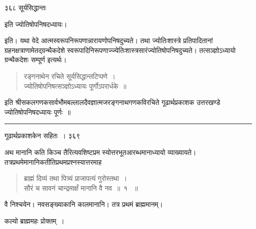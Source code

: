 \documentclass[11pt, openany]{book}
\begin{document}
\newpage


\noindent ३६८ \hspace{4cm} सूर्यसिद्धान्तः 
\vspace{1cm}

\begin{center}
  इति ज्योतिषोपनिषदध्यायः। 
\end{center}



 इति। यथा वेदे आत्मस्वरूपनिरूपणान्नारायणोपनिषदुच्यते। तथा ज्योतिःशास्त्रे प्रतिपादितानां ग्रहनक्षत्राणामेतद्ग्रन्थैकदेशे स्वरूपादिनिरूपणाज्ज्येतिःशास्त्रसारंज्योतिषोपनिषदुच्यते। तत्सञ्ज्ञोऽध्यायो ग्रन्थैकदेशः सम्पूर्ण इत्यर्थः। 


\begin{quote}
 {\qt रङ्गनाथेन रचिते सूर्यसिद्धान्तटिप्पणे~।\\
 ज्योतिषोपनिषत्सञ्ज्ञोऽध्यायः पूर्णोऽपरार्धके~॥ }
 \end{quote}

इति श्रीसकलगणकसार्वभौमबल्लालदैवज्ञात्मजरङ्गनाथगणकविरचिते गूढार्थप्रकाशक उत्तरखण्डे ज्योतिषोपनिषदध्यायः पूर्णः~॥


\vspace{6cm}

\begin{center}
    \rule{8em}{.5pt}
\end{center}



\newpage



\hspace{3cm} गूढार्थप्रकाशकेन सहितः~। \hfill ३६९
\vspace{1cm}


 अथ मानानि कति किञ्च तैरित्यवशिष्टप्रम स्योत्तरभूतआरब्धमानाध्यायो व्याख्यायते। तत्रप्रथमेमानानिकतीतिप्रथमप्रश्नस्यात्तरमाह\textendash


 \begin{quote}
{\ssi ब्राह्मं दिव्यं तथा पित्र्यं प्राजापत्यं गुरोस्तथा~।\\
सौरं च सावनं चान्द्रमार्क्षं मानानि वै नव~॥~१ ~॥}
\end{quote}
 वै निश्चयेन। नवसङ्ख्याकानि कालमानानि। तत्र प्रथमं ब्राह्ममानम्। 

\begin{center}
{\qt  कल्यो ब्राह्ममहः प्रोक्तम्~।} 
\end{center}
\end{document}
